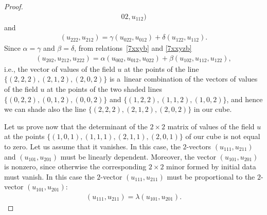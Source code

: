 \documentclass[11pt]{article}
\begin{document}
\begin{proof}
\begin{gather}
{0 2}, u_{1 1 2}) \label{7xxyb} \end{gather} and
\begin{gather} (u_{2 2 2}, u_{2 1 2}) =
\gamma (u_{0 2 2}, u_{0 1 2}) + \delta (u_{1 2 2}, u_{1 1 2}).
\label{7xxyzb}
\end{gather}
Since $\alpha = \gamma$ and $\beta = \delta$,
from relations~\eqref{7xxyb} and \eqref{7xxyzb}
\begin{gather*} (u_{2 0 2}, u_{2
1 2}, u_{2 2 2}) = \alpha (u_{0 0 2}, u_{0 1 2}, u_{0 2 2}) + \beta
(u_{1 0 2}, u_{1 1 2}, u_{1 2 2}), %
\end{gather*} i.e., the
vector of values of the f\/ield $u$ at the points of the line $\{(2,
2, 2), (2, 1, 2), (2, 0, 2)\}$ is a~linear combination of the
vectors of values of the f\/ield $u$ at the points of the two shaded
lines $\{(0, 2, 2), (0, 1, 2), (0, 0, 2)\}$ and $\{(1, 2, 2), (1, 1,
2), (1, 0, 2)\}$, and hence we can shade also the line $\{(2, 2, 2),
(2, 1, 2), (2, 0, 2)\}$ in our cube.


Let us prove now that the determinant of the $2 \times 2$ matrix of
values of the f\/ield $u$ at the points $\{(1, 0, 1), (1, 1, 1), (2,
1, 1), (2, 0, 1)\}$ of our cube is not equal to zero. Let us assume
that it vanishes. In this case, the $2$-vectors $(u_{1 1 1}, u_{2 1
1})$ and $(u_{1 0 1}, u_{2 0 1})$ must be linearly dependent.
Moreover, the vector $(u_{1 0 1}, u_{2 0 1})$ is nonzero, since
otherwise the corresponding $2 \times 2$ minor formed by initial
data must vanish. In this case the $2$-vector $(u_{1 1 1}, u_{2 1
1})$ must be proportional to the $2$-vector $(u_{1 0 1}, u_{2 0
1})$: \begin{gather} (u_{1 1 1}, u_{2 1 1}) = \lambda (u_{1 0 1}, u_{2 0 1}).
\label{6xxb} \end{gather}



\end{proof}
\end{document}
